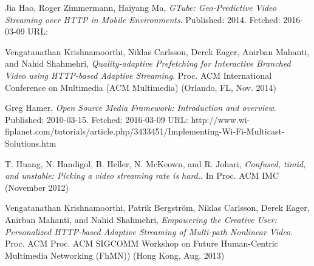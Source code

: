 \documentclass[9pt,a4paper]{acmproc}
\begin{document}
\clearpage
\begin{thebibliography}{9}

  Jia Hao, Roger Zimmermann, Haiyang Ma,
  \emph{GTube: Geo-Predictive Video Streaming over HTTP in Mobile Environments}.
  \newline
  Published: 2014. Fetched: 2016-03-09 
  \newline
	URL: 

  Vengatanathan Krishnamoorthi, Niklas Carlsson, Derek Eager, Anirban 
Mahanti, and Nahid Shahmehri,
  \emph{Quality-adaptive Prefetching for Interactive 
Branched Video using HTTP-based Adaptive Streaming}.
  \newline
  Proc. ACM 
International Conference on Multimedia (ACM Multimedia) (Orlando, FL, Nov. 
2014)

  Greg Hamer,
  \emph{Open Source Media Framework: Introduction and overview}.
  \newline
  Published: 2010-03-15. Fetched: 2016-03-09
 \newline
  URL: http://www.wi-fiplanet.com/tutorials/article.php/3433451/Implementing-Wi-Fi-Multicast-Solutions.htm
  
  T. Huang, N. Handigol, B. Heller, N. McKeown, and R. Johari,
  \emph{Confused, timid, and unstable: Picking a video streaming rate is hard.}.
  \newline
  In Proc. ACM IMC (November 2012)
  
  Vengatanathan Krishnamoorthi, Patrik Bergström, Niklas Carlsson, Derek 
Eager, Anirban Mahanti, and Nahid Shahmehri,
  \emph{Empowering the Creative User: 
Personalized HTTP-based Adaptive Streaming of Multi-path Nonlinear Video}.
  \newline
  Proc. ACM 
Proc. ACM SIGCOMM Workshop on Future Human-Centric Multimedia Networking 
(FhMN)) (Hong Kong, Aug. 2013)




\end{thebibliography}
\end{document}
